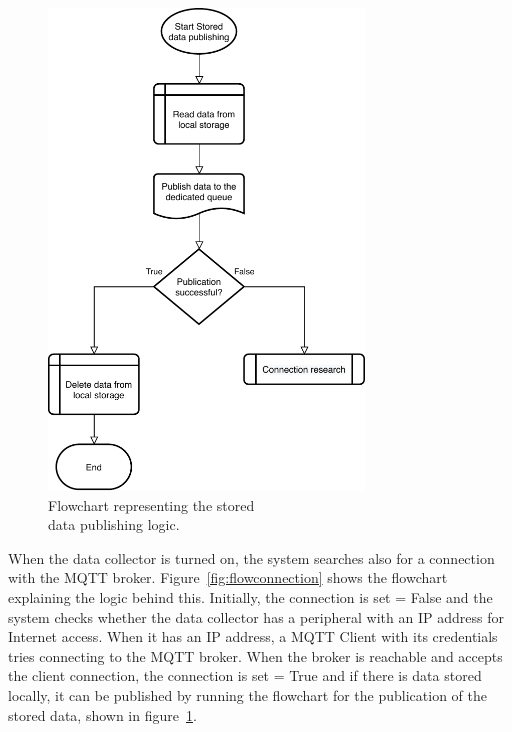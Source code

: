 \begin{figure}[h!]
\begin{minipage}[b]{8.5cm}
\includegraphics[width=0.75\textwidth]{images/flowstorage}
\caption{Flowchart representing the stored\\data publishing logic.}
\label{fig:flowstorage}
\end{minipage}
\end{figure}


When the data collector is turned on, the system searches also for a connection with the MQTT broker. Figure~\ref{fig:flowconnection} shows the flowchart explaining the logic behind this. Initially, the connection is set = False and the system checks whether the data collector has a peripheral with an IP address for Internet access.
When it has an IP address, a MQTT Client with its credentials tries connecting to the MQTT broker. When the broker is reachable and accepts the client connection, the connection is set = True and if there is data stored locally, it can be published by running the flowchart for the publication of the stored data, shown in figure~\ref{fig:flowstorage}.

